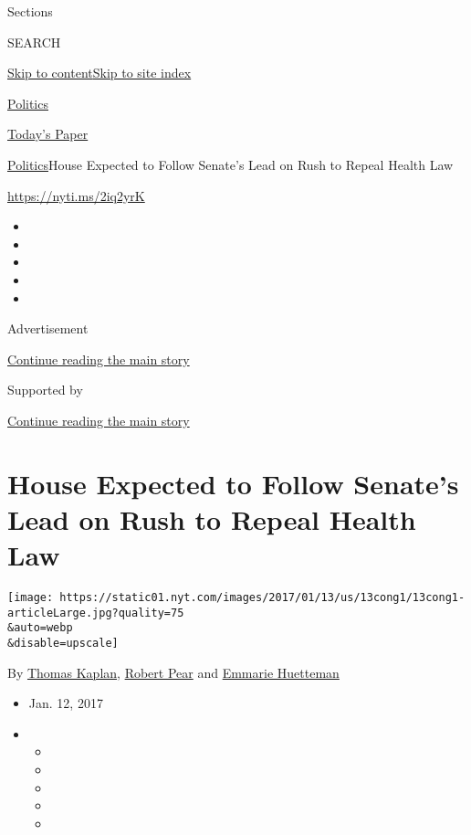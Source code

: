 Sections

SEARCH

\protect\hyperlink{site-content}{Skip to
content}\protect\hyperlink{site-index}{Skip to site index}

\href{https://www.nytimes.com/section/politics}{Politics}

\href{https://myaccount.nytimes.com/auth/login?response_type=cookie\&client_id=vi}{}

\href{https://www.nytimes.com/section/todayspaper}{Today's Paper}

\href{/section/politics}{Politics}\textbar{}House Expected to Follow
Senate's Lead on Rush to Repeal Health Law

\url{https://nyti.ms/2iq2yrK}

\begin{itemize}
\item
\item
\item
\item
\item
\end{itemize}

Advertisement

\protect\hyperlink{after-top}{Continue reading the main story}

Supported by

\protect\hyperlink{after-sponsor}{Continue reading the main story}

\hypertarget{house-expected-to-follow-senates-lead-on-rush-to-repeal-health-law}{%
\section{House Expected to Follow Senate's Lead on Rush to Repeal Health
Law}\label{house-expected-to-follow-senates-lead-on-rush-to-repeal-health-law}}

\texttt{[image: https://static01.nyt.com/images/2017/01/13/us/13cong1/13cong1-articleLarge.jpg?quality=75\\\&auto=webp\\\&disable=upscale]}

By \href{http://www.nytimes.com/by/thomas-kaplan}{Thomas Kaplan},
\href{https://www.nytimes.com/by/robert-pear}{Robert Pear} and
\href{https://www.nytimes.com/by/emmarie-huetteman}{Emmarie Huetteman}

\begin{itemize}
\item
  Jan. 12, 2017
\item
  \begin{itemize}
  \item
  \item
  \item
  \item
  \item
  \end{itemize}
\end{itemize}

